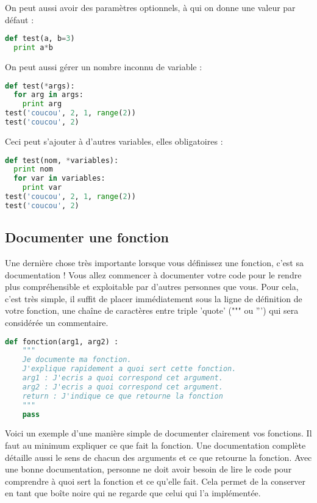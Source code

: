 \documentclass[a4paper,twoside]{article}
\begin{document}
On peut aussi avoir des paramètres optionnels, à qui on donne une valeur par défaut :
\begin{lstlisting}[language=python]
def test(a, b=3)
  print a*b
\end{lstlisting}

On peut aussi gérer un nombre inconnu de variable :
\begin{lstlisting}[language=python]
def test(*args):
  for arg in args:
    print arg
test('coucou', 2, 1, range(2))
test('coucou', 2)
\end{lstlisting}

Ceci peut s'ajouter à d'autres variables, elles obligatoires :
\begin{lstlisting}[language=python]
def test(nom, *variables):
  print nom
  for var in variables:
    print var
test('coucou', 2, 1, range(2))
test('coucou', 2)
\end{lstlisting}

\subsection{Documenter une fonction}

Une dernière chose très importante lorsque vous définissez une fonction, c'est sa documentation ! Vous allez commencer à documenter votre code pour le rendre plus compréhensible et exploitable par d'autres personnes que vous. Pour cela, c'est très simple, il suffit de placer immédiatement sous la ligne de définition de votre fonction, une chaîne de caractères entre triple 'quote' (""" ou ''') qui sera considérée un commentaire.

\begin{lstlisting}[language=python]
def fonction(arg1, arg2) :
    """
    Je documente ma fonction. 
    J'explique rapidement a quoi sert cette fonction.
    arg1 : J'ecris a quoi correspond cet argument.
    arg2 : J'ecris a quoi correspond cet argument.
    return : J'indique ce que retourne la fonction
    """
    pass
\end{lstlisting}

Voici un exemple d'une manière simple de documenter clairement vos fonctions. Il faut au minimum expliquer ce que fait la fonction. Une documentation complète détaille aussi le sens de chacun des arguments et ce que retourne la fonction. Avec une bonne documentation, personne ne doit avoir besoin de lire le code pour comprendre à quoi sert la fonction et ce qu'elle fait. Cela permet de la conserver en tant que boîte noire qui ne regarde que celui qui l'a implémentée.
\end{document}

